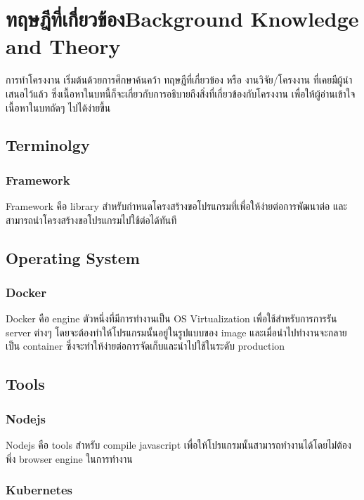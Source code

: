 \chapter{\ifcpe ทฤษฎีที่เกี่ยวข้อง\else Background Knowledge and Theory\fi}

การทำโครงงาน เริ่มต้นด้วยการศึกษาค้นคว้า ทฤษฎีที่เกี่ยวข้อง หรือ งานวิจัย/โครงงาน ที่เคยมีผู้นำเสนอไว้แล้ว ซึ่งเนื้อหาในบทนี้ก็จะเกี่ยวกับการอธิบายถึงสิ่งที่เกี่ยวข้องกับโครงงาน เพื่อให้ผู้อ่านเข้าใจเนื้อหาในบทถัดๆ ไปได้ง่ายขึ้น

\section{Terminolgy}

\subsection{Framework}

Framework \cite{framework} คือ library สำหรับกำหนดโครงสร้างขอโปรแกรมที่เพื่อให้ง่ายต่อการพัฒนาต่อ และสามารถนำโครงสร้างขอโปรแกรมไปใช้ต่อได้ทันที

\section{Operating System}

\subsection{Docker}

Docker \cite{docker} คือ engine ตัวหนึ่งที่มีการทำงานเป็น OS Virtualization \cite {osvirtual} เพื่อใช้สำหรับการการรัน server ต่างๆ โดยจะต้องทำให้โปรแกรมนั้นอยู่ในรูปแบบของ image และเมื่อนำไปทำงานจะกลายเป็น container ซึ่งจะทำให้ง่ายต่อการจัดเก็บและนำไปใช้ในระดับ production

\section{Tools}

\subsection{Nodejs}

Nodejs \cite{nodejs} คือ tools สำหรับ compile javascript \cite{javascript} เพื่อให้โปรแกรมนั้นสามารถทำงานได้โดยไม่่ต้องพึ่ง browser engine ในการทำงาน

\subsection{Kubernetes}

